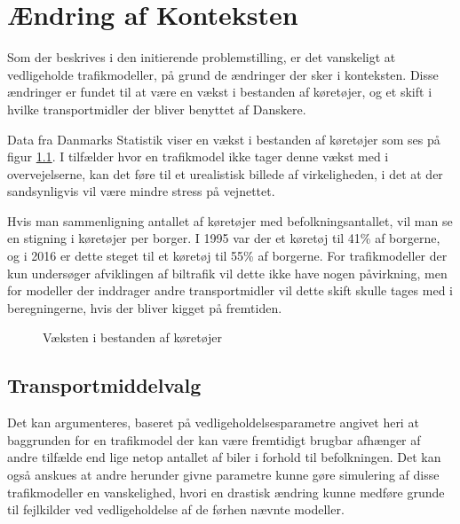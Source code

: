 \chapter{Ændring af Konteksten}\label{AenderingerAfKonteksten}
Som der beskrives i den initierende problemstilling, er det vanskeligt at vedligeholde trafikmodeller, på grund de ændringer der sker i konteksten. Disse ændringer er fundet til at være en vækst i bestanden af køretøjer, og et skift i hvilke transportmidler der bliver benyttet af Danskere.

\vspace{5mm}

Data fra Danmarks Statistik viser en vækst i bestanden af køretøjer som ses på figur \ref{plotvaekstbiler}. I tilfælder hvor en trafikmodel ikke tager denne vækst med i overvejelserne, kan det føre til et urealistisk billede af virkeligheden, i det at der sandsynligvis vil være mindre stress på vejnettet.

\vspace{5mm}

Hvis man sammenligning antallet af køretøjer med befolkningsantallet, vil man se en stigning i køretøjer per borger. I 1995 var der et køretøj til 41\% af borgerne, og i 2016 er dette steget til et køretøj til 55\% af borgerne. For trafikmodeller der kun undersøger afviklingen af biltrafik vil dette ikke have nogen påvirkning, men for modeller der inddrager andre transportmidler vil dette skift skulle tages med i beregningerne, hvis der bliver kigget på fremtiden.

\begin{figure}[h!]
    
    \caption{Væksten i bestanden af køretøjer}
    \label{plotvaekstbiler}
\end{figure}


\section{Transportmiddelvalg}
Det kan argumenteres, baseret på vedligeholdelsesparametre angivet heri at baggrunden for en trafikmodel der kan være fremtidigt brugbar afhænger af andre tilfælde end lige netop antallet af biler i forhold til befolkningen. Det kan også anskues at andre herunder givne parametre kunne gøre simulering af disse trafikmodeller en vanskelighed, hvori en drastisk ændring kunne medføre grunde til fejlkilder ved vedligeholdelse af de førhen nævnte modeller.

